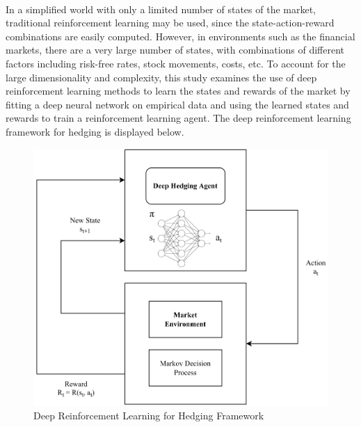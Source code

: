 \\
In a simplified world with only a limited number of states of the market, traditional reinforcement learning may be used, since the state-action-reward combinations are easily computed. However, in environments such as the financial markets, there are a very large number of states, with combinations of different factors including risk-free rates, stock movements, costs, etc. To account for the large dimensionality and complexity, this study examines the use of deep reinforcement learning methods to learn the states and rewards of the market by fitting a deep neural network on empirical data and using the learned states and rewards to train a reinforcement learning agent. The deep reinforcement learning framework for hedging is displayed below.
\begin{figure}[h]
\centering
\includegraphics[width=11.5cm]{templates/assets/drl/drl.png}
\caption{Deep Reinforcement Learning for Hedging Framework}
\end{figure}


